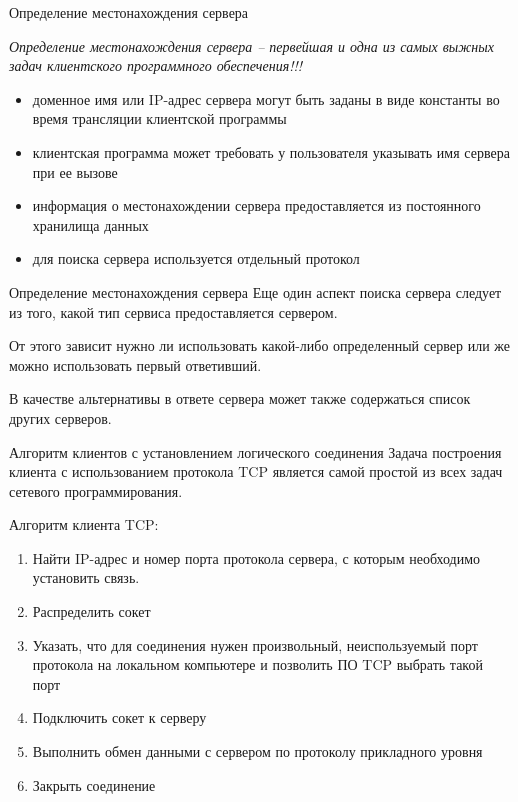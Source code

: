 \begin{frame}{Определение местонахождения сервера}

	{\itshape Определение местонахождения сервера -- первейшая и одна из самых выжных задач клиентского программного обеспечения!!!}
\pause
	\begin{itemize}
		\item доменное имя или IP-адрес сервера могут быть заданы в виде константы во время трансляции клиентской программы
			\pause
		\item клиентская программа может требовать у пользователя указывать имя сервера при ее вызове
			\pause
		\item информация о местонахождении сервера предоставляется из постоянного хранилища данных
			\pause
		\item для поиска сервера используется отдельный протокол
	\end{itemize}
\end{frame}

\begin{frame}{Определение местонахождения сервера}
Еще один аспект поиска сервера следует из того,  какой тип сервиса предоставляется сервером. 

От этого зависит нужно ли использовать какой-либо определенный сервер или же можно использовать первый ответивший. 

В качестве альтернативы в ответе сервера может также содержаться список других серверов.
\end{frame}

\begin{frame}{Алгоритм клиентов с установлением логического соединения}
Задача построения клиента с использованием протокола TCP является самой простой из всех задач сетевого программирования.

Алгоритм клиента TCP:
\begin{enumerate}
	\item Найти IP-адрес и номер порта протокола сервера,  с которым необходимо установить связь.
	\item Распределить сокет
	\item Указать,  что для соединения нужен произвольный,  неиспользуемый порт протокола на локальном компьютере и позволить ПО TCP выбрать такой порт
	\item Подключить сокет к серверу
	\item Выполнить обмен данными с сервером по протоколу прикладного уровня
	\item Закрыть соединение
\end{enumerate}
\end{frame}

